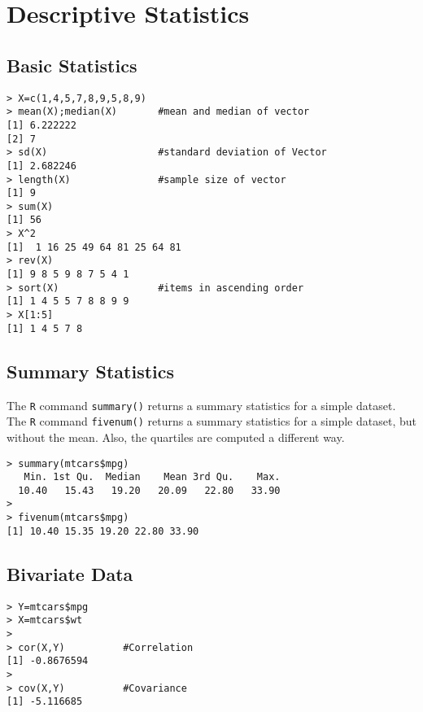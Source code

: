 
\chapter{Descriptive Statistics}

\section{Basic Statistics}

\footnotesize
\begin{myindentpar}{1cm}
\begin{verbatim}
> X=c(1,4,5,7,8,9,5,8,9)
> mean(X);median(X)       #mean and median of vector
[1] 6.222222
[2] 7
> sd(X)                   #standard deviation of Vector
[1] 2.682246
> length(X)               #sample size of vector
[1] 9
> sum(X)
[1] 56
> X^2
[1]  1 16 25 49 64 81 25 64 81
> rev(X)
[1] 9 8 5 9 8 7 5 4 1
> sort(X)                 #items in ascending order
[1] 1 4 5 5 7 8 8 9 9
> X[1:5]
[1] 1 4 5 7 8
\end{verbatim}
\end{myindentpar}
\normalsize


\section{Summary Statistics}
The \texttt{R} command \texttt{summary()} returns a summary statistics for a simple dataset.
The \texttt{R} command \texttt{fivenum()} returns a summary statistics for a simple dataset, but without the mean.
Also, the quartiles are computed a different way.

\footnotesize
\begin{myindentpar}{1cm}
\begin{verbatim}
> summary(mtcars$mpg)
   Min. 1st Qu.  Median    Mean 3rd Qu.    Max.
  10.40   15.43   19.20   20.09   22.80   33.90 
>
> fivenum(mtcars$mpg)
[1] 10.40 15.35 19.20 22.80 33.90
\end{verbatim}
\end{myindentpar}
\normalsize




\section{Bivariate Data}
\footnotesize \begin{myindentpar}{1cm}
\begin{verbatim}
> Y=mtcars$mpg
> X=mtcars$wt
>
> cor(X,Y)          #Correlation
[1] -0.8676594
>
> cov(X,Y)          #Covariance
[1] -5.116685
\end{verbatim}
\end{myindentpar}\normalsize


